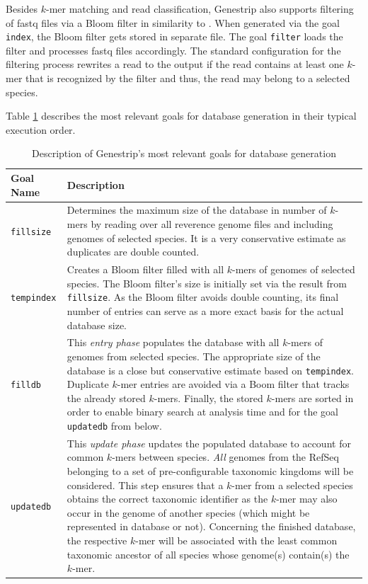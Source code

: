 \documentclass[letterpaper,11pt,leqno]{article}
\begin{document}
Besides $k$-mer matching and read classification, Genestrip also supports filtering of fastq files via a Bloom filter in similarity to \citep{biobloom}. When generated via the goal \verb|index|, the Bloom filter gets stored in separate file. The goal \verb|filter| loads the filter and processes fastq files accordingly. The standard configuration for the filtering process rewrites a read to the output if the read contains at least one $k$-mer that is recognized by the filter and thus, the read may belong to a selected species.

Table \ref{goals} describes the most relevant goals for database generation in their typical execution order.

\begin{table}[h]
\centering
\begin{tabular}{l|p{10cm}}
 Goal Name & Description \\
  \hline
 \verb|fillsize| & Determines the maximum size of the database in number of $k$-mers by reading over all reverence genome files and including genomes of selected species. It is a very conservative estimate as duplicates are double counted. \\
 \verb|tempindex| & Creates a Bloom filter filled with all $k$-mers of genomes of selected species. The Bloom filter's size is initially set via the result from \verb|fillsize|. As the Bloom filter avoids double counting, its final number of entries can serve as a more exact basis for the actual database size.\\
 \verb|filldb| & This \emph{entry phase} populates the database with all $k$-mers of genomes from selected species. The appropriate size of the database is a close but conservative estimate based on \verb|tempindex|.
  Duplicate $k$-mer entries are avoided via a Boom filter that tracks the already stored $k$-mers. Finally, the stored $k$-mers are sorted in order to enable binary search at analysis time and for the goal \verb|updatedb| from below.\\
 \verb|updatedb| & This \emph{update phase} updates the populated database to account for common $k$-mers between species.
 \emph{All} genomes from the RefSeq belonging to a set of pre-configurable taxonomic kingdoms will be considered. This step ensures that a $k$-mer from a selected species obtains the correct taxonomic identifier as the $k$-mer may also occur in the genome of another species (which might be represented in database or not). Concerning the finished database, the respective $k$-mer will be associated with the least common taxonomic ancestor of all species whose genome(s) contain(s) the $k$-mer.\\
\end{tabular}
\caption{Description of Genestrip's most relevant goals for database generation}\label{goals}
\end{table}
\end{document}
